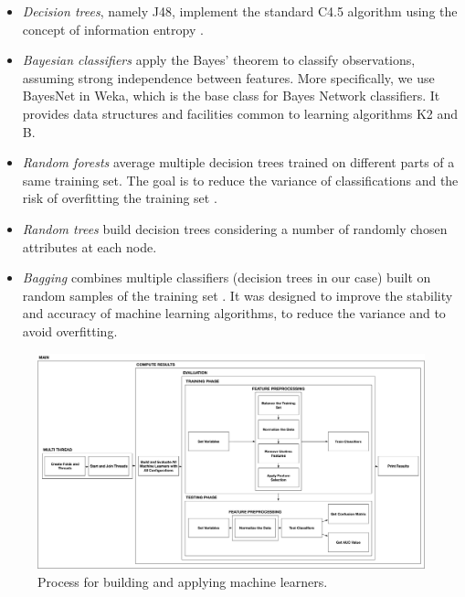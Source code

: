 \begin{itemize}
\item \textit{Decision trees}, namely J48, implement the standard C4.5 algorithm using the concept of information entropy \citep{Quinlan1993}.
\item \textit{Bayesian classifiers} apply the Bayes' theorem to classify observations, assuming strong independence between features. More specifically, we use BayesNet in Weka, which is the base class for Bayes Network classifiers. It provides data structures and facilities common to learning algorithms K2 and B.
\item \textit{Random forests} average multiple decision trees trained on different parts of a same training set. The goal is to reduce the variance of classifications and the risk of overfitting the training set \citep{Breiman2001}.
\item \textit{Random trees} build decision trees considering a number of randomly chosen attributes at each node.
\item \textit{Bagging} combines multiple classifiers (decision trees in our case) built on random samples of the training set \citep{Breiman1996}. It was designed to improve the stability and accuracy of machine learning algorithms, to reduce the variance and to avoid overfitting.
\end{itemize}

 
\begin{landscape}
 \begin{figure}[t]
 	\centering
 	\includegraphics[width=\linewidth]{figs/MachineLearning.pdf}
 	\caption{Process for building and applying machine learners.}
 	\label{fig:MLProcess}
 	\vspace{-4mm}
 \end{figure}
\end{landscape}
 
